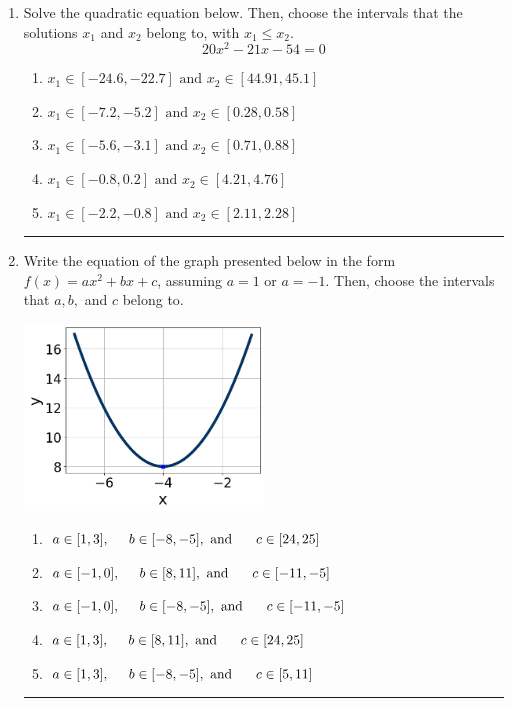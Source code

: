 \documentclass[14pt]{extbook}
\newcommand{\litem}[1]{\item#1\hspace*{-1cm}\rule{\textwidth}{0.4pt}}
\begin{document}
\begin{enumerate}
{\begin{enumerate}[label=\Alph*.]
\end{enumerate} }
\litem{
Solve the quadratic equation below. Then, choose the intervals that the solutions $x_1$ and $x_2$ belong to, with $x_1 \leq x_2$.\[ 20x^{2} -21 x -54 = 0 \]\begin{enumerate}[label=\Alph*.]
\item \( x_1 \in [-24.6, -22.7] \text{ and } x_2 \in [44.91, 45.1] \)
\item \( x_1 \in [-7.2, -5.2] \text{ and } x_2 \in [0.28, 0.58] \)
\item \( x_1 \in [-5.6, -3.1] \text{ and } x_2 \in [0.71, 0.88] \)
\item \( x_1 \in [-0.8, 0.2] \text{ and } x_2 \in [4.21, 4.76] \)
\item \( x_1 \in [-2.2, -0.8] \text{ and } x_2 \in [2.11, 2.28] \)

\end{enumerate} }
\litem{
Write the equation of the graph presented below in the form $f(x)=ax^2+bx+c$, assuming  $a=1$ or $a=-1$. Then, choose the intervals that $a, b,$ and $c$ belong to.
\begin{center}
    \includegraphics[width=0.5\textwidth]{../Figures/quadraticGraphToEquationCopyC.png}
\end{center}
\begin{enumerate}[label=\Alph*.]
\item \( a \in [1, 3], \hspace*{5mm} b \in [-8, -5], \text{ and } \hspace*{5mm} c \in [24, 25] \)
\item \( a \in [-1, 0], \hspace*{5mm} b \in [8, 11], \text{ and } \hspace*{5mm} c \in [-11, -5] \)
\item \( a \in [-1, 0], \hspace*{5mm} b \in [-8, -5], \text{ and } \hspace*{5mm} c \in [-11, -5] \)
\item \( a \in [1, 3], \hspace*{5mm} b \in [8, 11], \text{ and } \hspace*{5mm} c \in [24, 25] \)
\item \( a \in [1, 3], \hspace*{5mm} b \in [-8, -5], \text{ and } \hspace*{5mm} c \in [5, 11] \)


\end{enumerate}}
\end{enumerate}
\end{document}
